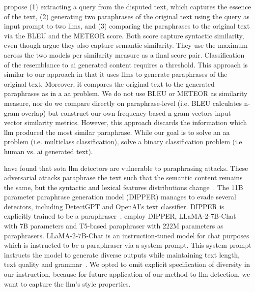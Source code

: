 \citet{baradia_mirror_2025} propose (1) extracting a query from the disputed text, which captures the essence of the text, 
(2) generating two paraphrases of the original text using the query as input prompt to two \acp{llm}, 
and (3) comparing the paraphrases to the original text via the BLEU and the METEOR score.
Both score capture syntactic similarity, even though \citet{baradia_mirror_2025} argue they also capture semantic similarity.
They use the maximum across the two models per similarity measure as a final score pair.
Classification of the resemblance to \ac{ai} generated content requires a threshold.
This approach is similar to our approach in that it uses \acp{llm} to generate paraphrases of the original text.
Moreover, it compares the original text to the generated paraphrases as in a \ac{aa} problem. %
We do not use BLEU or METEOR as similarity measure, nor do we compare directly on paraphrase-level (i.e. BLEU calculates n-gram overlap) 
but construct our own frequency based n-gram vectors input vector similarity metrics.
However, this approach discards the information which \ac{llm} produced the most similar paraphrase. 
While our goal is to solve an \ac{aa} problem (i.e. multiclass classification), 
\citet{baradia_mirror_2025} solve a binary classification problem (i.e. human vs. \ac{ai} generated text).



\citet{Krishna_dipper_2023} have found that \acl{sota} \ac{llm} detectors are vulnerable to paraphrasing attacks.
These adversarial attacks paraphrase the text such that the semantic content remains the same, but the syntactic and lexical features distributions change~\citep{wang_stumbling_2024}.
The 11B parameter paraphrase generation model (DIPPER) manages to evade several detectors, including DetectGPT and OpenAI's text classifier.
DIPPER is explicitly trained to be a paraphraser~\citep{Krishna_dipper_2023}.
\citet{Sadasivan_t5_2023} employ DIPPER, LLaMA-2-7B-Chat with 7B parameters and T5-based paraphraser with 222M parameters as paraphrasers.
LLaMA-2-7B-Chat is an instruction-tuned model for chat purposes which is instructed to be a paraphraser via a system prompt.
This system prompt instructs the model to generate diverse outputs while maintaining text length, text quality and grammar~\citep{Sadasivan_t5_2023}.
We opted to omit explicit specification of diversity in our instruction, because for future application of our method to \ac{llm} detection, we want to capture the \ac{llm}'s style properties.

